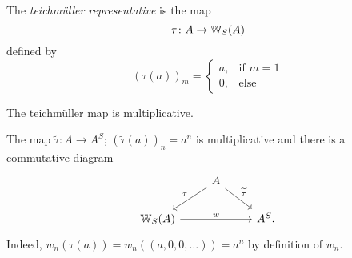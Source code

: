 \begin{definition}
    The \textit{teichmüller representative} is the map
    \[
      \tau \colon A \to \mathbb{W}_S(A)  
    \]
    defined by
    \[
      (\tau(a))_m =   
      \begin{cases}
        a, & \text{if } m = 1\\
        0, & \text{else}
        \end{cases}
    \]
\end{definition}
\begin{lemma} \label{lem: teichmüller is multiplicative}
    The teichmüller map is multiplicative.
\end{lemma}
\begin{beweis}
    The map $\widetilde{\tau} \colon A \to A^S$; $(\widetilde{\tau}(a))_n = a^n$
    is multiplicative and there is a commutative diagram
    \[
        \begin{tikzcd}
              & A \arrow[rd,"\widetilde{\tau}"] \\ %
            \W_S(A) \arrow[ru, leftarrow,"\tau"] \arrow[rr,"w"]
                && A^S.
        \end{tikzcd}
    \]
    Indeed, $w_n(\tau(a)) = w_n((a,0,0,\dots)) = a^n$
    by definition of $w_n$.

\end{beweis}
